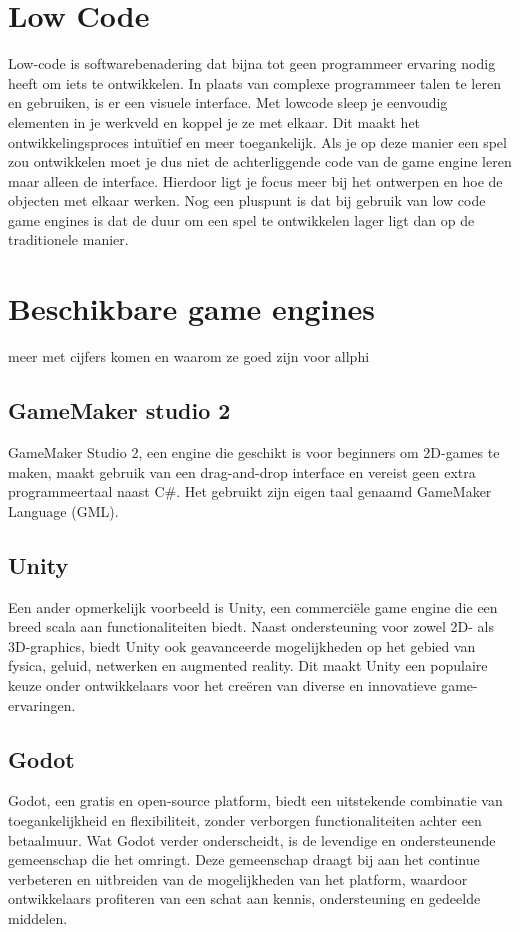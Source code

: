 \section{Low Code}
Low-code is softwarebenadering dat bijna tot geen programmeer ervaring nodig heeft om iets te ontwikkelen. In plaats van complexe programmeer talen te leren en gebruiken, is er een visuele interface.\autocite{Kissflow2024} Met lowcode sleep je eenvoudig elementen in je werkveld en koppel je ze met elkaar. Dit maakt het ontwikkelingsproces intuïtief en meer toegankelijk. Als je op deze manier een spel zou ontwikkelen moet je dus niet de achterliggende code van de game engine leren maar alleen de interface. Hierdoor ligt je focus meer bij het ontwerpen en hoe de objecten met elkaar werken. Nog een pluspunt is dat bij gebruik van low code game engines is dat de duur om een spel te ontwikkelen lager ligt dan op de traditionele manier.


\section{Beschikbare game engines}
meer met cijfers komen en waarom ze goed zijn voor allphi
\subsection{GameMaker studio 2}
GameMaker Studio 2, een engine die geschikt is voor beginners om 2D-games te maken, maakt gebruik van een drag-and-drop interface en vereist geen extra programmeertaal naast C\#. Het gebruikt zijn eigen taal genaamd GameMaker Language (GML). \autocite{cossu2019game}

\subsection{Unity}
Een ander opmerkelijk voorbeeld is Unity, een commerciële game engine die een breed scala aan functionaliteiten biedt. Naast ondersteuning voor zowel 2D- als 3D-graphics, biedt Unity ook geavanceerde mogelijkheden op het gebied van fysica, geluid, netwerken en augmented reality. Dit maakt Unity een populaire keuze onder ontwikkelaars voor het creëren van diverse en innovatieve game-ervaringen. \autocite{Haas2014}

\subsection{Godot}
Godot, een gratis en open-source platform, biedt een uitstekende combinatie van toegankelijkheid en flexibiliteit, zonder verborgen functionaliteiten achter een betaalmuur. Wat Godot verder onderscheidt, is de levendige en ondersteunende gemeenschap die het omringt. Deze gemeenschap draagt bij aan het continue verbeteren en uitbreiden van de mogelijkheden van het platform, waardoor ontwikkelaars profiteren van een schat aan kennis, ondersteuning en gedeelde middelen. \autocite{Bradfield2018}

